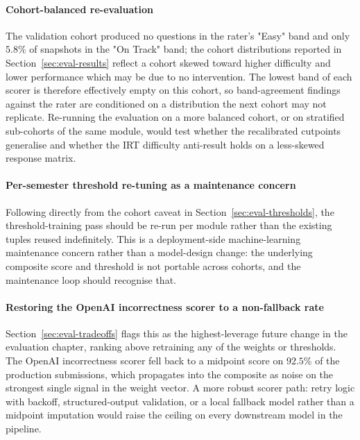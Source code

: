 \paragraph{Cohort-balanced re-evaluation}
The validation cohort produced no questions in the rater's "Easy" band and only $5.8\%$ of snapshots in the "On Track" band; the cohort distributions reported in Section~\ref{sec:eval-results} reflect a cohort skewed toward higher difficulty and lower performance which may be due to no intervention.
The lowest band of each scorer is therefore effectively empty on this cohort, so band-agreement findings against the rater are conditioned on a distribution the next cohort may not replicate.
Re-running the evaluation on a more balanced cohort, or on stratified sub-cohorts of the same module, would test whether the recalibrated cutpoints generalise and whether the IRT difficulty anti-result holds on a less-skewed response matrix.

\paragraph{Per-semester threshold re-tuning as a maintenance concern}
Following directly from the cohort caveat in Section~\ref{sec:eval-thresholds}, the threshold-training pass should be re-run per module rather than the existing tuples reused indefinitely.
This is a deployment-side machine-learning maintenance concern rather than a model-design change: the underlying composite score and threshold is not portable across cohorts, and the maintenance loop should recognise that.

\paragraph{Restoring the OpenAI incorrectness scorer to a non-fallback rate}
Section~\ref{sec:eval-tradeoffs} flags this as the highest-leverage future change in the evaluation chapter, ranking above retraining any of the weights or thresholds.
The OpenAI incorrectness scorer fell back to a midpoint score on $92.5\%$ of the production submissions, which propagates into the composite as noise on the strongest single signal in the weight vector.
A more robust scorer path: retry logic with backoff, structured-output validation, or a local fallback model rather than a midpoint imputation would raise the ceiling on every downstream model in the pipeline.

